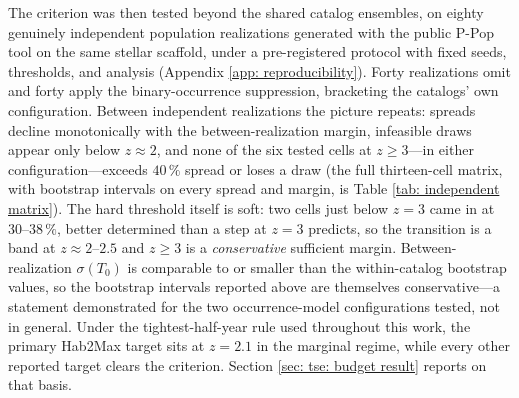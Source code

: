 \documentclass[12pt,a4paper]{article}
\numberwithin{equation}{section}
\numberwithin{figure}{section}
\numberwithin{table}{section}
\begin{document}
The criterion was then tested beyond the shared catalog ensembles, on eighty genuinely independent population realizations generated with the public P-Pop tool on the same stellar scaffold, under a pre-registered protocol with fixed seeds, thresholds, and analysis (Appendix \ref{app: reproducibility}). Forty realizations omit and forty apply the binary-occurrence suppression, bracketing the catalogs' own configuration. Between independent realizations the picture repeats: spreads decline monotonically with the between-realization margin, infeasible draws appear only below $z\approx2$, and none of the six tested cells at $z\geq3$---in either configuration---exceeds $40\,\%$ spread or loses a draw (the full thirteen-cell matrix, with bootstrap intervals on every spread and margin, is Table \ref{tab: independent matrix}). The hard threshold itself is soft: two cells just below $z=3$ came in at $30$--$38\,\%$, better determined than a step at $z=3$ predicts, so the transition is a band at $z\approx2$--$2.5$ and $z\geq3$ is a \emph{conservative} sufficient margin. Between-realization $\sigma(T_0)$ is comparable to or smaller than the within-catalog bootstrap values, so the bootstrap intervals reported above are themselves conservative---a statement demonstrated for the two occurrence-model configurations tested, not in general. Under the tightest-half-year rule used throughout this work, the primary Hab2Max target sits at $z=2.1$ in the marginal regime, while every other reported target clears the criterion. Section \ref{sec: tse: budget result} reports on that basis.
\end{document}
